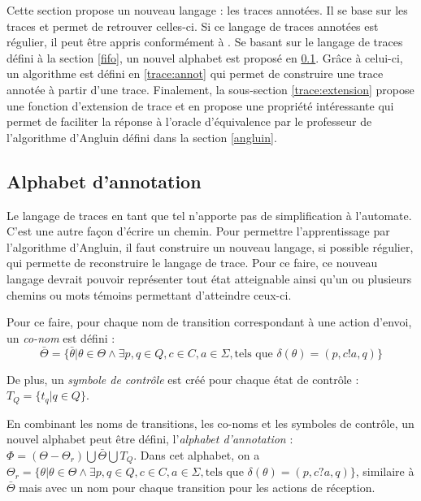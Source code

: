 Cette section propose un nouveau langage : les traces annotées. Il se base sur les traces et permet de retrouver celles-ci. Si ce langage de traces annotées est régulier, il peut être appris conformément à \cite{Vardhan04}. Se basant sur le langage de traces défini à la section \ref{fifo}, un nouvel alphabet est proposé en \ref{trace:alpha}. Grâce à celui-ci, un algorithme est défini en \ref{trace:annot} qui permet de construire une trace annotée à partir d'une trace. Finalement, la sous-section \ref{trace:extension} propose une fonction d'extension de trace et en propose une propriété intéressante qui permet de faciliter la réponse à l'oracle d'équivalence par le professeur de l'algorithme d'Angluin défini dans la section \ref{angluin}.





\subsection{Alphabet d'annotation}\label{trace:alpha}

Le langage de traces en tant que tel n'apporte pas de simplification à l'automate. C'est une autre façon d'écrire un chemin. Pour permettre l'apprentissage par l'algorithme d'Angluin, il faut construire un nouveau langage, si possible régulier, qui permette de reconstruire le langage de trace. Pour ce faire, ce nouveau langage devrait pouvoir représenter tout état atteignable ainsi qu'un ou plusieurs chemins ou mots témoins permettant d'atteindre ceux-ci.

Pour ce faire, pour chaque nom de transition correspondant à une action d'envoi, un \emph{co-nom} est défini :
$$
\bar{\Theta}=\{\bar{\theta}|\theta\in\Theta\wedge\exists p,q \in Q, c\in C, a\in\Sigma,\text{tels que } \delta(\theta)=(p,c!a,q)\}
$$

De plus, un \emph{symbole de contrôle} est créé pour chaque état de contrôle : $T_Q = \{t_q | q\in Q\}$.

En combinant les noms de transitions, les co-noms et les symboles de contrôle, un nouvel alphabet peut être défini, l'\emph{alphabet d'annotation} : $\Phi=(\Theta-\Theta_r)\bigcup\bar{\Theta}\bigcup T_Q$. Dans cet alphabet, on a $\Theta_r=\{\theta|\theta\in\Theta\wedge\exists p,q \in Q, c\in C, a\in\Sigma,\text{tels que } \delta(\theta)=(p,c?a,q)\}$, similaire à $\bar{\Theta}$ mais avec un nom pour chaque transition pour les actions de réception.


